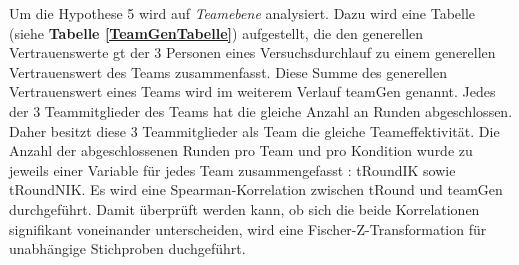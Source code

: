 \documentclass[a4paper,11pt]{article}%
\renewcommand{\\}{\vspace*{0.5\baselineskip} \newline}
\begin{document}
Um die Hypothese 5 wird auf \textit{Teamebene} analysiert. Dazu wird eine Tabelle (siehe \textbf{Tabelle \ref{TeamGenTabelle}}) aufgestellt, die den generellen Vertrauenswerte \ac{gt} der 3 Personen eines Versuchsdurchlauf zu einem generellen Vertrauenswert des Teams zusammenfasst. Diese Summe des generellen Vertrauenswert eines Teams wird im weiterem Verlauf \ac{teamGen} genannt.
Jedes der 3 Teammitglieder des Teams hat die gleiche Anzahl an Runden abgeschlossen. Daher besitzt diese 3 Teammitglieder als Team die gleiche Teameffektivität. Die Anzahl der abgeschlossenen Runden pro Team und pro Kondition wurde zu jeweils einer Variable für jedes Team zusammengefasst : \ac{tRoundIK} sowie \ac{tRoundNIK}.
Es wird eine Spearman-Korrelation zwischen \ac{tRound} und \ac{teamGen} durchgeführt. Damit überprüft werden kann, ob sich die beide Korrelationen signifikant voneinander unterscheiden, wird eine Fischer-Z-Transformation für unabhängige Stichproben duchgeführt.\\
%
\end{document}
